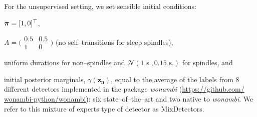 \documentclass[runningheads]{llncs}
\begin{document}
For  the unsupervised setting, we set sensible initial conditions: \begin{enumerate*}[label=\roman*)]
	\item $\text{\boldmath$\pi$\unboldmath} = [1, 0]^\top$, 
	\item $A = \bigl( \begin{smallmatrix}0.5 & 0.5\\ 1 & 0\end{smallmatrix}\bigr)$ (no self--transitions for sleep spindles),
	\item uniform durations for non--spindles and $\mathcal{N}(1 \text{ s.}, 0.15 \text{ s.})$ for spindles, and
	\item initial posterior marginals, $\gamma(\mathbf{z_{n}})$, equal to the average of the labels from 8 different detectors implemented in the package \textit{wonambi} (\url{https://github.com/ wonambi-python/wonambi}): six state--of--the--art \cite{ferrarelli2007reduced,molle2011fast,nir2011regional,leclercq2011fmri,wamsley2012reduced,martin2013topography} and two native to \textit{wonambi}. We refer to this mixture of experts type of detector as MixDetectors.
\end{enumerate*}
\end{document}
